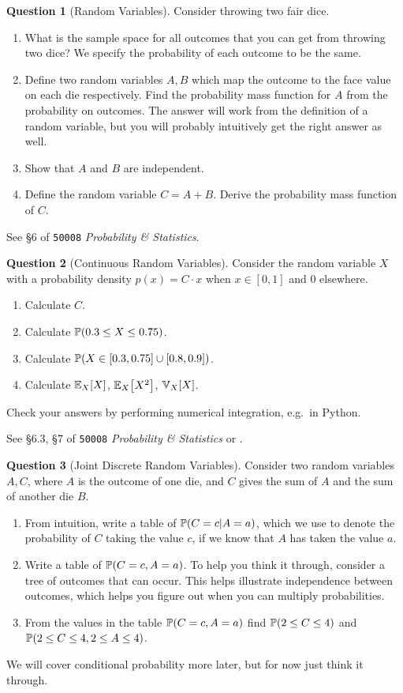 \documentclass[a4paper]{article}
\theoremstyle{definition}
\newtheorem{question}{Question}
\newcommand{\courseprobstats}{\texttt{50008} \textit{Probability \& Statistics}}
\begin{document}
\begin{question}[Random Variables]
\label{q:rv}
Consider throwing two fair dice.
\begin{enumerate}[label=\alph*.]
    \item What is the sample space for all outcomes that you can get from throwing two dice? We specify the probability of each outcome to be the same.
    \item Define two random variables $A,B$ which map the outcome to the face value on each die respectively. Find the probability mass function for $A$ from the probability on outcomes. The answer will work from the definition of a random variable, but you will probably intuitively get the right answer as well.
    \item Show that $A$ and $B$ are independent.
    \item Define the random variable $C = A + B$. Derive the probability mass function of $C$.
\end{enumerate}
See \S6 of \courseprobstats{}.
\end{question}


\begin{question}[Continuous Random Variables]
\label{q:crv}
Consider the random variable $X$ with a probability density $p(x) = C\cdot x$ when $x \in [0, 1]$ and $0$ elsewhere.
\begin{enumerate}[label=\alph*.]
    \item Calculate $C$.
    \item Calculate $\prob{0.3 \leq X \leq 0.75}$.
    \item Calculate $\prob{X \in [0.3, 0.75] \cup [0.8, 0.9]}$.
    \item Calculate $\Exp{X}{X}$, $\Exp{X}{X^2}$, $\Var{X}{X}$.
\end{enumerate}
Check your answers by performing numerical integration, e.g.~in Python.

See \S6.3, \S7 of \courseprobstats{} or \citet[\S 6.2.2]{mml}.
\end{question}


\begin{question}[Joint Discrete Random Variables]
\label{q:jdrv}
Consider two random variables $A,C$, where $A$ is the outcome of one die, and $C$ gives the sum of $A$ and the sum of another die $B$.
\begin{enumerate}[label=\alph*.]
    \item From intuition, write a table of $\prob{C=c|A=a}$, which we use to denote the probability of $C$ taking the value $c$, if we know that $A$ has taken the value $a$.
    \item Write a table of $\prob{C=c, A=a}$. To help you think it through, consider a tree of outcomes that can occur. This helps illustrate independence between outcomes, which helps you figure out when you can multiply probabilities.
    \item From the values in the table $\prob{C=c, A=a}$ find $\prob{2 \leq C \leq 4}$ and $\prob{2 \leq C \leq 4, 2 \leq A \leq 4}$.
\end{enumerate}
We will cover conditional probability more later, but for now just think it through.
\end{question}
\end{document}

